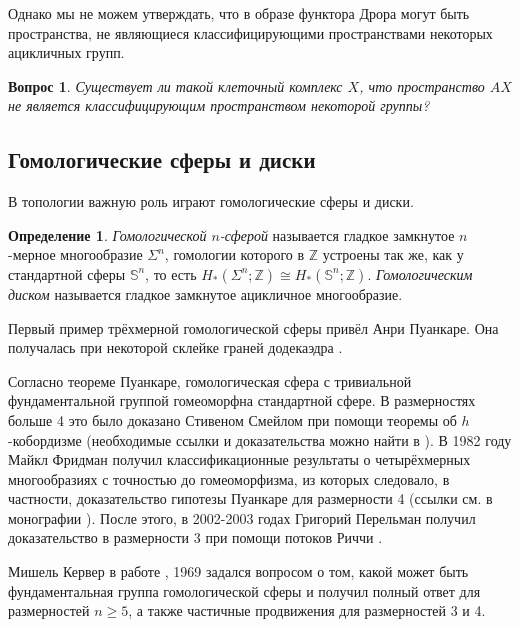 \documentclass[14pt, dvipsnames, twoside]{extarticle}
\newtheorem{question}{Вопрос}
\theoremstyle{definition}
\newtheorem{defi}{Определение}
\theoremstyle{remark}
\begin{document}
 Однако мы не можем утверждать, что в образе функтора Дрора могут быть пространства, не являющиеся классифицирующими пространствами некоторых ацикличных групп.
 
 \begin{question}
 Существует ли такой клеточный комплекс $X$, что пространство $AX$ не является классифицирующим пространством некоторой группы? 
 \end{question}
 



 
 
 
 
 
 
 
 
  \subsection{Гомологические сферы и диски}\label{homol_spheres}
 
 
 
 
 
 
 В топологии важную роль играют гомологические сферы и диски. 
  
 \begin{defi}
 {\it Гомологической $n$-сферой} называется гладкое замкнутое $n$-мерное многообразие $\Sigma^n$, гомологии которого в $\mathbb{Z}$ устроены так же, как у стандартной сферы $\mathbb{S}^n$, то есть $H_\ast(\Sigma^n; \mathbb{Z})\cong H_\ast(\mathbb{S}^n; \mathbb{Z})$. {\it Гомологическим диском} называется гладкое замкнутое ацикличное многообразие.  
 \end{defi}
 
Первый пример трёхмерной гомологической сферы привёл Анри Пуанкаре. Она получалась при некоторой склейке граней додекаэдра \cite{Poincare}.
 
 Согласно теореме Пуанкаре, гомологическая сфера с тривиальной фундаментальной группой гомеоморфна стандартной сфере. В размерностях больше 4 это было доказано Стивеном Смейлом при помощи теоремы об $h$-кобордизме (необходимые ссылки и доказательства можно найти в \cite{Milnor_h}). В 1982 году Майкл Фридман получил классификационные результаты о четырёхмерных многообразиях с точностью до гомеоморфизма, из которых следовало, в частности, доказательство гипотезы Пуанкаре для размерности 4 (ссылки см. в монографии \cite{Scorpan}). После этого, в 2002-2003 годах Григорий Перельман получил доказательство в размерности 3 при помощи потоков Риччи \cite{Perelman}.  
 
  
 Мишель Кервер в работе \cite{Kervaire}, 1969 задался вопросом о том, какой может быть фундаментальная группа гомологической сферы и получил полный ответ для размерностей $n\geqslant 5$, а также частичные продвижения для размерностей 3 и 4.
\end{document}
